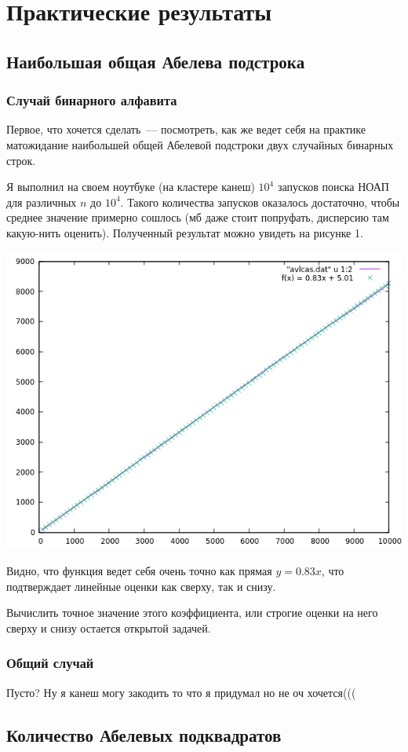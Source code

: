 \chapter{Практические результаты}
\section{Наибольшая общая Абелева подстрока}
\subsection{Случай бинарного алфавита}

Первое, что хочется сделать~--- посмотреть, как же ведет себя на практике матожидание наибольшей общей Абелевой подстроки двух случайных бинарных строк. 

Я выполнил на своем ноутбуке (на кластере канеш) $10^4$ запусков поиска НОАП для различных $n$ до $10^4$. Такого количества запусков оказалось достаточно, чтобы среднее значение примерно сошлось (мб даже стоит попруфать, дисперсию там какую-нить оценить). Полученный результат можно увидеть на рисунке 1.

\includegraphics{pics/avlcas.png}

Видно, что функция ведет себя очень точно как прямая $y=0.83x$, что подтверждает линейные оценки как сверху, так и снизу.

Вычислить точное значение этого коэффициента, или строгие оценки на него сверху и снизу остается открытой задачей. 

\subsection{Общий случай}
Пусто? Ну я канеш могу закодить то что я придумал но не оч хочется(((

\section{Количество Абелевых подквадратов}